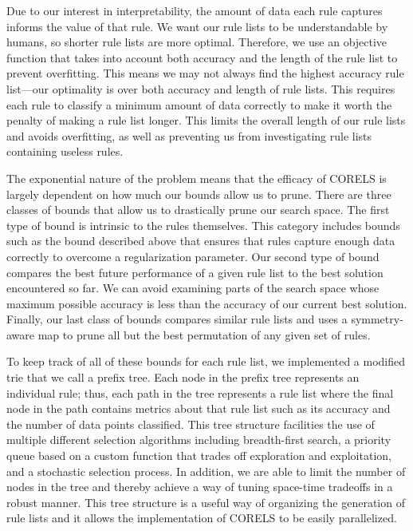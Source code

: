 Due to our interest in interpretability, the amount of data each rule captures informs the value of that rule. 
We want our rule lists to be understandable by humans, so shorter rule lists are more optimal. 
Therefore, we use an objective function that takes into account both accuracy and the length of the rule list to prevent overfitting. 
This means we may not always find the highest accuracy rule list---our optimality is over both accuracy and length of rule lists.
This requires each rule to classify a minimum amount of data correctly to make it worth the penalty of making a rule list longer. 
This limits the overall length of our rule lists and avoids overfitting, as well as preventing us from investigating rule lists containing useless rules.

The exponential nature of the problem means that the efficacy of CORELS is largely dependent on how much our bounds allow us to prune. 
There are three classes of bounds that allow us to drastically prune our search space. 
The first type of bound is intrinsic to the rules themselves.
This category includes bounds such as the bound described above that ensures that rules capture enough data correctly to overcome a regularization parameter. 
Our second type of bound compares the best future performance of a given rule list to the best solution encountered so far. 
We can avoid examining parts of the search space whose maximum possible accuracy is less than the accuracy of our current best solution. 
Finally, our last class of bounds compares similar rule lists and uses a symmetry-aware map to prune all but the best permutation of any given set of rules.

To keep track of all of these bounds for each rule list, we implemented a modified trie that we call a prefix tree. 
Each node in the prefix tree represents an individual rule; thus, each path in the tree represents a rule list where the final node in the path contains metrics about that rule list such as its accuracy and the number of data points classified.
This tree structure facilities the use of multiple different selection algorithms including breadth-first search, a priority queue based on a custom function that trades off exploration and exploitation, and a stochastic selection process. 
In addition, we are able to limit the number of nodes in the tree and thereby achieve a way of tuning space-time tradeoffs in a robust manner. 
This tree structure is a useful way of organizing the generation of rule lists and it allows the implementation of CORELS to be easily parallelized.

